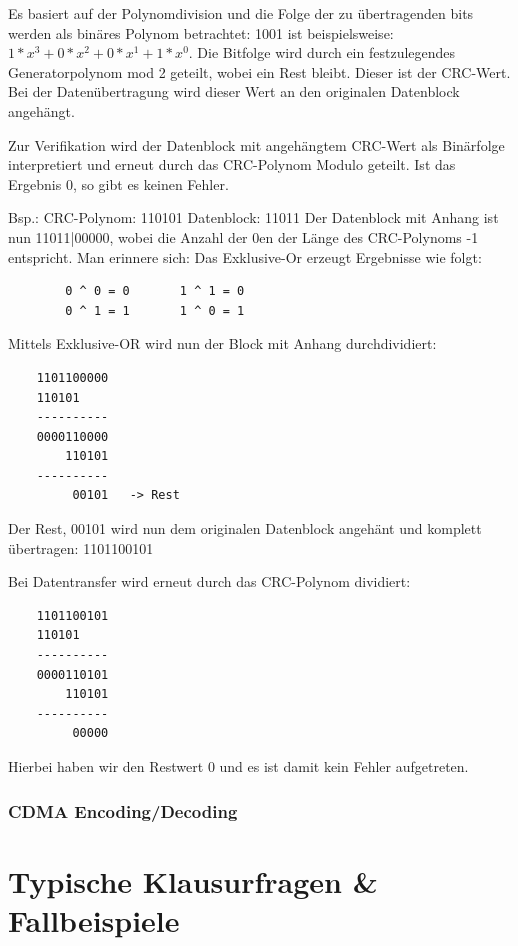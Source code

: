 \documentclass{article}
\begin{document}
    Es basiert auf der Polynomdivision und die Folge der zu übertragenden bits werden als binäres Polynom betrachtet: 1001 ist beispielsweise: $1*x^3 + 0*x^2 + 0*x^1 + 1*x^0$.
    Die Bitfolge wird durch ein festzulegendes Generatorpolynom mod 2 geteilt, wobei ein Rest bleibt. Dieser ist der CRC-Wert. Bei der Datenübertragung wird dieser Wert an den originalen Datenblock angehängt.
    
    Zur Verifikation wird der Datenblock mit angehängtem CRC-Wert als Binärfolge interpretiert und erneut durch das CRC-Polynom Modulo geteilt. Ist das Ergebnis 0, so gibt es keinen Fehler.
    
    
    Bsp.:
    CRC-Polynom: 110101
    Datenblock: 11011
    Der Datenblock mit Anhang ist nun 11011|00000, wobei die Anzahl der 0en der Länge des CRC-Polynoms -1 entspricht. Man erinnere sich: Das Exklusive-Or erzeugt Ergebnisse wie folgt:
    \begin{verbatim}
        0 ^ 0 = 0       1 ^ 1 = 0
        0 ^ 1 = 1       1 ^ 0 = 1
    \end{verbatim}
    Mittels Exklusive-OR wird nun der Block mit Anhang durchdividiert:

    \begin{verbatim}
    1101100000
    110101
    ----------
    0000110000
        110101
    ----------
         00101   -> Rest
    \end{verbatim}
    Der Rest, 00101 wird nun dem originalen Datenblock angehänt und komplett übertragen: 1101100101
    
    Bei Datentransfer wird erneut durch das CRC-Polynom dividiert:
    \begin{verbatim}
    1101100101
    110101
    ----------
    0000110101
        110101
    ----------
         00000
    \end{verbatim}
    Hierbei haben wir den Restwert 0 und es ist damit kein Fehler aufgetreten.
    
    \subsubsection{ CDMA Encoding/Decoding}
    
\section{Typische Klausurfragen \& Fallbeispiele}
\end{document}
